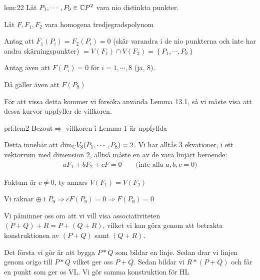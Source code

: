 \par\bigskip
\begin{lem}[2]{lem:22}
  Låt $P_1,\cdots,P_9\in\mathbb{C} P^2$ vara nio distinkta punkter.\par
  \noindent Låt $F, F_1, F_2$ vara homogena tredjegradspolynom\par
  \noindent Antag att $F_1(P_i) = F_2(P_i) = 0$ (skär varandra i de nio punkterna och inte har andra skärningspunkter) $= V(F_1)\cap V(F_2) = \left\{P_1,\cdots,P_9\right\}$\par
  \noindent Antag även att $F(P_i) = 0$ för $i=1,\cdots, 8$ (ja, 8).\par
  \noindent Då gäller även att $F(P_9)$
\end{lem}
\par\bigskip
\noindent För att vissa detta kommer vi försöka använda Lemma 13.1, så vi måste visa att dessa kurvor uppfyller de villkoren.
\par\bigskip
\begin{prf}[Lemma 2]{prf:lem2}
  Bezout$\Rightarrow$ villkoren i Lemma 1 är uppfyllda\par
  \noindent Detta innebär att dim$_{\mathbb{C}} V_3(P_1,\cdots, P_8)=2$. Vi har alltås 3 ekvationer, i ett vektorrum med dimension 2, alltså måste en av de vara linjärt beroende:
  \begin{equation*}
    \begin{gathered}
      aF_1+bF_2+cF = 0\qquad\text{(inte alla $a,b,c=0$)}
    \end{gathered}
  \end{equation*}\par
  \noindent Faktum är $c\neq0$, ty annars $V(F_1) = V(F_2)$
  \par\bigskip
  \noindent Vi räknar $\oplus$ i $P_9\Rightarrow cF(P_9)=0\Rightarrow F(P_9)=0$
\end{prf}
\newpage
\noindent Vi påminner oss om att vi vill visa associativiteten $(P+Q)+R = P+(Q+R)$, vilket vi kan göra genom att betrakta konstruktionen av $(P+Q)$ samt $(Q+R)$.\par
\noindent Det första vi gör är att bygga $P*Q$ som bildar en linje. Sedan drar vi linjen genom origo till $P*Q$ vilket ger oss $P+Q$. Sedan bildar vi $R*(P+Q)$ och får en punkt som ger os VL. Vi gör samma konstruktion för HL
